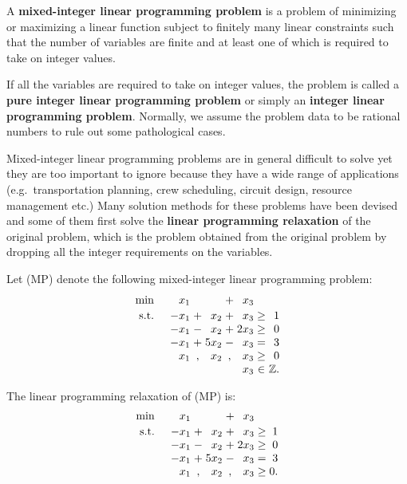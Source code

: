A \textbf{mixed-integer linear programming problem} is a problem of
minimizing or maximizing a linear function subject to finitely many
linear constraints such that the number of variables are finite and at
least one of which is required to take on integer values.

If all the variables are required to take on integer values, the problem
is called a \textbf{pure integer linear programming problem} or simply
an \textbf{integer linear programming problem}. Normally, we assume the
problem data to be rational numbers to rule out some pathological cases.

Mixed-integer linear programming problems are in general difficult to
solve yet they are too important to ignore because they have a wide
range of applications (e.g.~transportation planning, crew scheduling,
circuit design, resource management etc.) Many solution methods for
these problems have been devised and some of them first solve the
\textbf{linear programming relaxation} of the original problem, which is
the problem obtained from the original problem by dropping all the
integer requirements on the variables.

\begin{example}{}{}
\protect\hypertarget{ex:ilp-ex}{}{\label{ex:ilp-ex}} Let (MP) denote the
following mixed-integer linear programming problem:
\[
\begin{array}{l r@{\;}c@{\;}r@{\;}c@{\;}r@{\;}c@{\;}r}
\min & x_1  &   &      & + & x_3  &      &   \\[2pt]
\st  & -x_1 & + &  x_2 & + &  x_3 & \geq & 1 \\
     & -x_1 & - &  x_2 & + & 2x_3 & \geq & 0 \\
     & -x_1 & + & 5x_2 & - &  x_3 & =    & 3 \\
     &  x_1 & , &  x_2 & , &  x_3 & \geq & 0 \\
     &      &   &      &   &  x_3 & \in  & \mathbb{Z}.
\end{array}
\]

The linear programming relaxation of (MP) is: \[
\begin{array}{l r@{\;}c@{\;}r@{\;}c@{\;}r@{\;}c@{\;}r}
\min & x_1  &   &      & + & x_3  &      &   \\[2pt]
\st  & -x_1 & + &  x_2 & + &  x_3 & \geq & 1 \\
     & -x_1 & - &  x_2 & + & 2x_3 & \geq & 0 \\
     & -x_1 & + & 5x_2 & - &  x_3 & =    & 3 \\
     &  x_1 & , &  x_2 & , &  x_3 & \geq & 0.
\end{array}
\]
\end{example}

